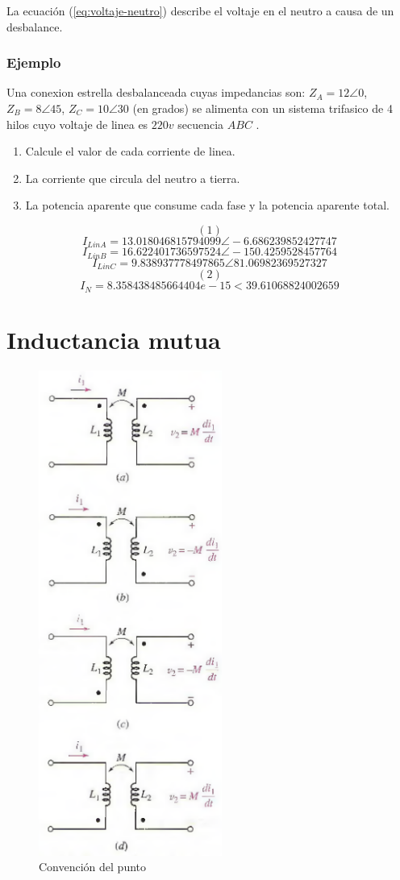 \documentclass[11pt]{article}
\begin{document}
La ecuación (\ref{eq:voltaje-neutro}) describe el voltaje en el
neutro a causa de un desbalance.
\subsubsection{Ejemplo}
\label{sec:orgheadline6}
Una conexion estrella desbalanceada cuyas impedancias son:
\(Z_A=12\angle 0\), \(Z_B=8\angle 45\), \(Z_C=10\angle 30\) (en grados)
se alimenta con un sistema trifasico de 4 hilos cuyo voltaje de
linea es \(220v\) secuencia \(ABC\) .
\begin{enumerate}
\item Calcule el valor de cada corriente de linea.
\item La corriente que circula del neutro a tierra.
\item La potencia aparente que consume cada fase y la potencia
aparente total.
\end{enumerate}

$$(1)$$
$$I_{LinA}= 13.018046815794099\angle-6.686239852427747$$
$$I_{LinB}= 16.622401736597524\angle-150.4259528457764$$
$$I_{LinC}= 9.838937778497865\angle81.06982369527327$$
$$(2)$$
$$I_N=8.358438485664404e-15<39.61068824002659$$
\section{Inductancia mutua}
\label{sec:orgheadline11}
\begin{figure}
\centering
\includegraphics[width=6cm]{data/e4/817abd-f3f7-4574-aada-b974440e3a0e/screenshot-20151103-204815.png}
\caption{Convención del punto}
\end{figure}
\end{document}
